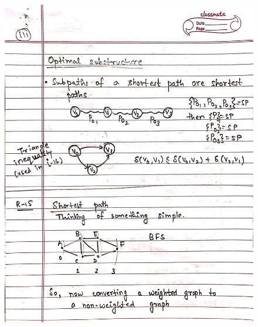 \begin{figure}[H]
    \centering
    \includegraphics[scale=0.25]{"./MIT 6.006/MIT_6006_111"}
\end{figure}
\newpage
